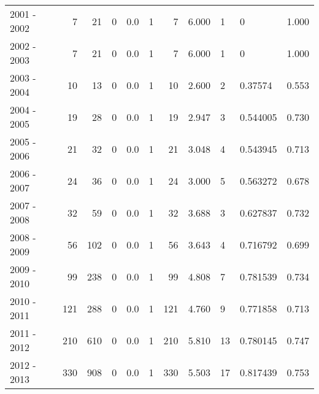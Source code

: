 \begin{tabular}{lrrrrrrrllr}
2001 - 2002 &        7 &       21 &                 0 &               0.0 &                       1 &                          7 &       6.000 &             1 &          0 &             1.000 \\
2002 - 2003 &        7 &       21 &                 0 &               0.0 &                       1 &                          7 &       6.000 &             1 &          0 &             1.000 \\
2003 - 2004 &       10 &       13 &                 0 &               0.0 &                       1 &                         10 &       2.600 &             2 &    0.37574 &             0.553 \\
2004 - 2005 &       19 &       28 &                 0 &               0.0 &                       1 &                         19 &       2.947 &             3 &   0.544005 &             0.730 \\
2005 - 2006 &       21 &       32 &                 0 &               0.0 &                       1 &                         21 &       3.048 &             4 &   0.543945 &             0.713 \\
2006 - 2007 &       24 &       36 &                 0 &               0.0 &                       1 &                         24 &       3.000 &             5 &   0.563272 &             0.678 \\
2007 - 2008 &       32 &       59 &                 0 &               0.0 &                       1 &                         32 &       3.688 &             3 &   0.627837 &             0.732 \\
2008 - 2009 &       56 &      102 &                 0 &               0.0 &                       1 &                         56 &       3.643 &             4 &   0.716792 &             0.699 \\
2009 - 2010 &       99 &      238 &                 0 &               0.0 &                       1 &                         99 &       4.808 &             7 &   0.781539 &             0.734 \\
2010 - 2011 &      121 &      288 &                 0 &               0.0 &                       1 &                        121 &       4.760 &             9 &   0.771858 &             0.713 \\
2011 - 2012 &      210 &      610 &                 0 &               0.0 &                       1 &                        210 &       5.810 &            13 &   0.780145 &             0.747 \\
2012 - 2013 &      330 &      908 &                 0 &               0.0 &                       1 &                        330 &       5.503 &            17 &   0.817439 &             0.753 \\

\end{tabular}
